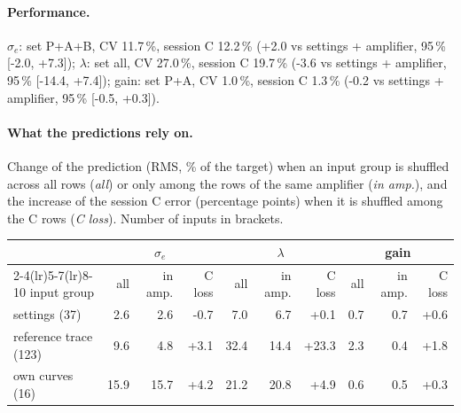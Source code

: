 \paragraph{Performance.}
$\sigma_e$: set P+A+B, CV 11.7\,\%, session C 12.2\,\% (+2.0 vs settings + amplifier, 95\,\% [-2.0, +7.3]); $\lambda$: set all, CV 27.0\,\%, session C 19.7\,\% (-3.6 vs settings + amplifier, 95\,\% [-14.4, +7.4]); gain: set P+A, CV 1.0\,\%, session C 1.3\,\% (-0.2 vs settings + amplifier, 95\,\% [-0.5, +0.3]).
\paragraph{What the predictions rely on.} Change of the prediction (RMS, \% of the target) when an input group is shuffled across all rows (\emph{all}) or only among the rows of the same amplifier (\emph{in amp.}), and the increase of the session C error (percentage points) when it is shuffled among the C rows (\emph{C loss}). Number of inputs in brackets.
\begin{center}\footnotesize
\begin{tabular}{lrrrrrrrrr}
\toprule
 & \multicolumn{3}{c}{$\sigma_e$} & \multicolumn{3}{c}{$\lambda$} & \multicolumn{3}{c}{gain} \\
\cmidrule(lr){2-4}\cmidrule(lr){5-7}\cmidrule(lr){8-10}
input group & all & in amp. & C loss & all & in amp. & C loss & all & in amp. & C loss \\
\midrule
settings (37) & 2.6 & 2.6 & -0.7 & 7.0 & 6.7 & +0.1 & 0.7 & 0.7 & +0.6 \\
reference trace (123) & 9.6 & 4.8 & +3.1 & 32.4 & 14.4 & +23.3 & 2.3 & 0.4 & +1.8 \\
own curves (16) & 15.9 & 15.7 & +4.2 & 21.2 & 20.8 & +4.9 & 0.6 & 0.5 & +0.3 \\
\bottomrule
\end{tabular}
\end{center}
